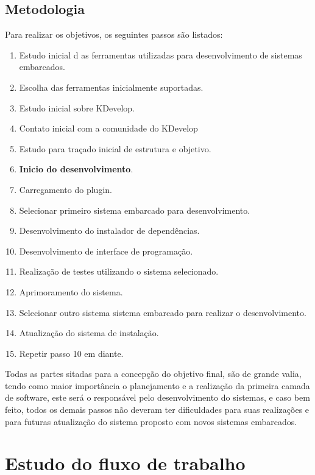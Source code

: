 \subsection{Metodologia}
\label{ss:objetivosespecificos}
Para realizar os objetivos, os seguintes passos são listados:
\begin{enumerate}
\item Estudo inicial d	as ferramentas utilizadas para desenvolvimento de sistemas embarcados.
\item Escolha das ferramentas inicialmente suportadas.
\item Estudo inicial sobre KDevelop.
\item Contato inicial com a comunidade do KDevelop%
\item Estudo para traçado inicial de estrutura e objetivo.
\item \textbf{Inicio do desenvolvimento}.
\item Carregamento do plugin.
\item Selecionar primeiro sistema embarcado para desenvolvimento.
\item Desenvolvimento do instalador de dependências.
\item Desenvolvimento de interface de programação.
\item Realização de testes utilizando o sistema selecionado.
\item Aprimoramento do sistema.
\item Selecionar outro sistema sistema embarcado para realizar o desenvolvimento.
\item Atualização do sistema de instalação.
\item Repetir passo 10 em diante.
\end{enumerate}

Todas as partes sitadas para a concepção do objetivo final, são de grande valia, tendo como maior importância o planejamento e a realização da primeira camada de software, este será o responsável pelo desenvolvimento do sistemas, e caso bem feito, todos os demais passos não deveram ter dificuldades para suas realizações e para futuras atualização do sistema proposto com novos sistemas embarcados.

\section{Estudo do fluxo de trabalho}

